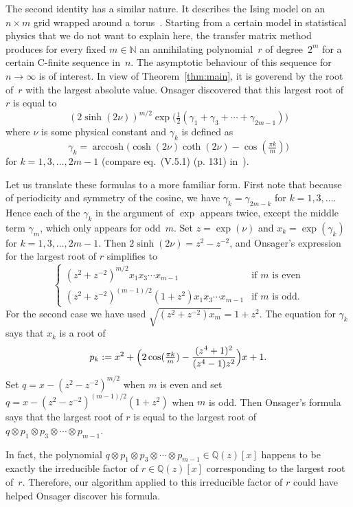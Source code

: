 \documentclass{sig-alternate}
\let\set\mathbb
\begin{document}
The second identity has a similar nature. It describes the Ising model on an
$n\times m$ grid wrapped around a torus~\cite{onsager44,thompson72}. Starting
from a certain model in statistical physics that we do not want to explain here,
the transfer matrix method produces for every fixed $m\in\set N$ an annihilating
polynomial~$r$ of degree~$2^m$ for a certain C-finite sequence in~$n$. The
asymptotic behaviour of this sequence for $n\to\infty$ is of interest. In view
of Theorem~\ref{thm:main}, it is goverend by the root of~$r$ with the largest
absolute value. Onsager discovered that this largest root of~$r$ is equal to
\[
 (2\sinh(2\nu))^{m/2}\exp\bigl(\tfrac12(\gamma_1+\gamma_3+\cdots+\gamma_{2m-1})\bigr)
\]
where $\nu$ is some physical constant and $\gamma_k$ is defined as
\def\arccosh{\operatorname{arccosh}}
\[
  \gamma_k = \arccosh\bigl(\cosh(2\nu)\coth(2\nu) - \cos(\tfrac{\pi k}m)\bigr)
\]
for $k=1,3,\dots,2m-1$ (compare eq.~(V.5.1) (p. 131) in~\cite{thompson72}). 

Let us translate these formulas to a more familiar form.
First note that because of periodicity and symmetry of the cosine,
we have $\gamma_k=\gamma_{2m-k}$ for $k=1,3,\dots$. Hence each of the
$\gamma_k$ in the argument of $\exp$ appears twice, except the
middle term $\gamma_m$, which only appears for odd~$m$.
Set $z=\exp(\nu)$ and $x_k=\exp(\gamma_k)$ for $k=1,3,\dots,2m-1$.
Then $2\sinh(2\nu)=z^2-z^{-2}$, and Onsager's expression for the
largest root of $r$ simplifies to
\[
  \left\{\begin{array}{ll}
  (z^2+z^{-2})^{m/2}x_1x_3\cdots x_{m-1} &\text{if $m$ is even}\\
  (z^2+z^{-2})^{(m-1)/2}(1+z^2)x_1x_3\cdots x_{m-1}&\text{if $m$ is odd}.
  \end{array}\right.
\]
For the second case we have used $\sqrt{(z^2+z^{-2})x_m}=1+z^2$.
The equation for $\gamma_k$ says that $x_k$ is a root of 
\[
 p_k:=x^2 + \Bigl(2\cos(\tfrac{\pi k}m) -\frac{(z^4+1)^2}{(z^4-1)z^2}\Bigr)x + 1.
\]
Set $q=x-(z^2-z^{-2})^{m/2}$ when $m$ is even and set $q=x-(z^2-z^{-2})^{(m-1)/2}(1+z^2)$
when $m$ is odd. Then Onsager's formula says that the largest root of $r$ is equal
to the largest root of $q\otimes p_1\otimes p_3\otimes\cdots\otimes p_{m-1}$.

In fact, the polynomial $q\otimes p_1\otimes p_3\otimes\cdots\otimes p_{m-1}\in\set Q(z)[x]$ happens to be
exactly the irreducible factor of $r\in\set Q(z)[x]$ corresponding to the largest root of~$r$. Therefore,
our algorithm applied to this irreducible factor of $r$ could have helped Onsager discover his formula.



\end{document}
